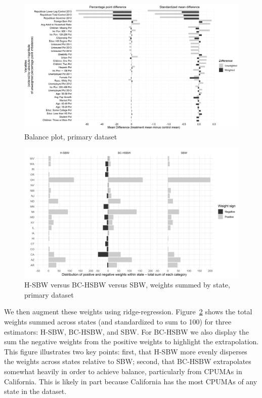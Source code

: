 \documentclass[aoas]{imsart}
\theoremstyle{plain}
\theoremstyle{remark}
\begin{document}
\begin{figure}[H]
\begin{center}
    \caption{Balance plot, primary dataset}\label{fig:loveplotc1}
    \includegraphics[scale=0.45]{01_Plots/balance-plot-all-etuc1.png}
\end{center}
\end{figure}

\begin{figure}[H]
\begin{center}
    \caption{H-SBW versus BC-HSBW versus SBW, weights summed by state, primary dataset}
    \label{fig:sbwvhsbw1}
    \includegraphics[scale=0.55]{01_Plots/weights-by-state-sbw-hsbw-c1.png}
\end{center}
\end{figure}

We then augment these weights using ridge-regression. Figure~\ref{fig:sbwvhsbw1} shows the total weights summed across states (and standardized to sum to 100) for three estimators: H-SBW, BC-HSBW, and SBW. For BC-HSBW we also display the sum the negative weights from the positive weights to highlight the extrapolation. This figure illustrates two key points: first, that H-SBW more evenly disperses the weights across states relative to SBW; second, that BC-HSBW extrapolates somewhat heavily in order to achieve balance, particularly from CPUMAs in California. This is likely in part because California has the most CPUMAs of any state in the dataset.
\end{document}
